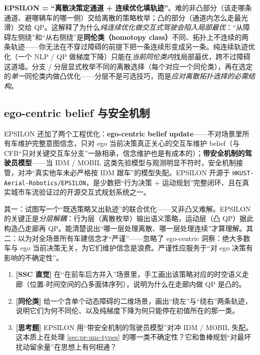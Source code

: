 \begin{insight}
\textbf{EPSILON = “离散决策定通道 + 连续优化填轨迹”}。难的非凸部分（该走哪条通道、避哪辆车的哪一侧）交给离散的策略枚举；凸的部分（通道内怎么走最光滑）交给 QP。这解释了为什么\emph{纯连续优化做交互式驾驶会陷入局部最优}：“从障碍左侧绕”和“从右侧绕”是\textbf{同伦类（homotopy class）}不同、拓扑上不连续的两条轨迹——你无法在不穿过障碍的前提下把一条连续形变成另一条。纯连续轨迹优化（一个 NLP / QP 做梯度下降）只能在\emph{当前同伦类内}找局部最优，跨不过障碍这道墙。分支 / 分层显式枚举不同的离散选择（每个对应一个同伦类），再在选定的\emph{单一}同伦类内做凸优化——分层不是可选技巧，而是\emph{应对离散拓扑选择的必需结构}。
\end{insight}

\subsection{ego-centric belief 与安全机制}
\label{sec:pr-epsilon-belief}

EPSILON 还加了两个工程优化\cite{ding2021epsilon}：\textbf{ego-centric belief update}——不对场景里所有车维护完整意图信念，只对 ego 当前决策真正关心的交互车维护 belief（与 CFB“只对关键交互车分支”一脉相承，信念维护也是有成本的）；\textbf{带安全机制的驾驶员模型}——当 IDM / MOBIL 这类先验模型与观测明显不符时，安全机制接管，对冲“真实他车未必严格按 IDM 跟车”的模型失配。EPSILON 开源于 \texttt{HKUST-Aerial-Robotics/EPSILON}，是少数把“行为决策 + 运动规划”完整闭环、且在真实城市车流验证过的开源交互式规划系统之一。

\begin{pitfall}
其一：试图写一个“既选策略又出轨迹”的联合优化——又非凸又难解。EPSILON 的关键正是\emph{分层解耦}：行为层（离散枚举）输出语义策略，运动层（凸 QP）据此构造凸走廊再 QP。能清楚说出“哪一层处理离散、哪一层处理连续”才算理解。其二：以为对全场景所有车建信念才“严谨”——忽略了 ego-centric 洞察：绝大多数车与 ego 当前决策无关，为它们维护信念是浪费。严谨性应服务于“对 ego 决策有影响的不确定性”。
\end{pitfall}

\begin{practice}
\begin{enumerate}
  \item \textbf{[SSC 直觉]} 在“在前车后方并入”场景里，手工画出该策略对应的时空语义走廊（位置-时间空间的凸多面体序列），说明为什么在走廊内做 QP 是凸的。
  \item \textbf{[同伦类]} 给一个含单个动态障碍的二维场景，画出“绕左”与“绕右”两条轨迹，说明它们为何不同伦、以及纯梯度下降为何只能停在初值所在的那一类。
  \item \textbf{[思考题]} EPSILON 用“带安全机制的驾驶员模型”对冲 IDM / MOBIL 失配。这本质上在处理 \cref{sec:pr-unc-types} 的哪一类不确定性？它和鲁棒规划“对最坏扰动留余量”在思想上有何相通？
\end{enumerate}
\end{practice}

